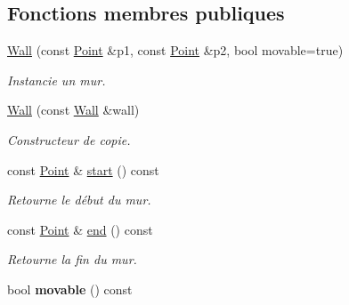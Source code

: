 \subsection*{Fonctions membres publiques}
\begin{DoxyCompactItemize}
\item 
\hyperlink{classWall_af8bbfd7bd810a0728769c7eed06ef38f}{Wall} (const \hyperlink{classPoint}{Point} \&p1, const \hyperlink{classPoint}{Point} \&p2, bool movable=true)
\begin{DoxyCompactList}\small\item\em Instancie un mur. \end{DoxyCompactList}\item 
\hyperlink{classWall_af9843adb784b97d73bdb74a7992bf825}{Wall} (const \hyperlink{classWall}{Wall} \&wall)
\begin{DoxyCompactList}\small\item\em Constructeur de copie. \end{DoxyCompactList}\item 
const \hyperlink{classPoint}{Point} \& \hyperlink{classWall_a0e3acb1aa5f837e1dc6b353a473bc9d4}{start} () const 
\begin{DoxyCompactList}\small\item\em Retourne le début du mur. \end{DoxyCompactList}\item 
const \hyperlink{classPoint}{Point} \& \hyperlink{classWall_ad8ab4f9a70757c77c70bc153e9a3bf1f}{end} () const 
\begin{DoxyCompactList}\small\item\em Retourne la fin du mur. \end{DoxyCompactList}\item 
\hypertarget{classWall_a1f834d6f719d7b5ac4ae2428fef627e4}{bool {\bfseries movable} () const }\label{classWall_a1f834d6f719d7b5ac4ae2428fef627e4}


\end{DoxyCompactItemize}
